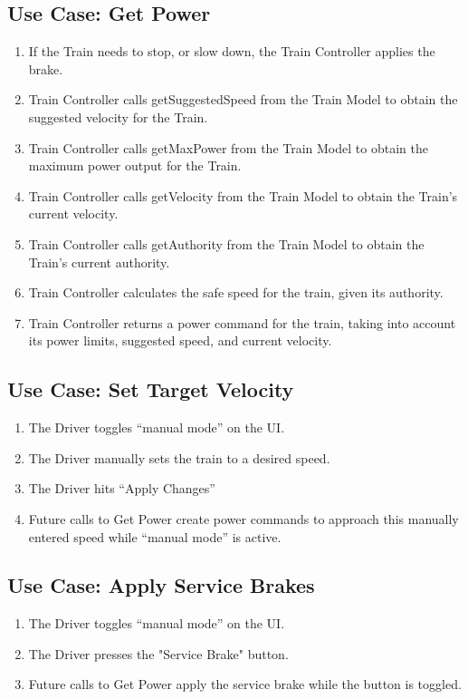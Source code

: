 \documentclass{scrreprt}
\begin{document}
\subsection{Use Case: Get Power}
\begin{enumerate}
	\item If the Train needs to stop, or slow down, the Train Controller applies the brake.
	\item Train Controller calls getSuggestedSpeed from the Train Model to obtain the suggested velocity for the Train.
	\item Train Controller calls getMaxPower from the Train Model to obtain the maximum power output for the Train.
	\item Train Controller calls getVelocity from the Train Model to obtain the Train's current velocity.
	\item Train Controller calls getAuthority from the Train Model to obtain the Train's current authority.
	\item Train Controller calculates the safe speed for the train, given its authority.
	\item Train Controller returns a power command for the  train, taking into account its power limits, suggested speed, and current velocity.
\end{enumerate}

\subsection{Use Case: Set Target Velocity}
\begin{enumerate}
	\item The Driver toggles “manual mode” on the UI.
	\item The Driver manually sets the train to a desired speed.
	\item The Driver hits “Apply Changes”
	\item Future calls to Get Power create power commands to approach this manually entered speed while “manual mode” is active.
\end{enumerate}

\subsection{Use Case: Apply Service Brakes}
\begin{enumerate}
	\item The Driver toggles “manual mode” on the UI.
	\item The Driver presses the "Service Brake" button.
	\item Future calls to Get Power apply the service brake while the button is toggled.
\end{enumerate}
\end{document}
